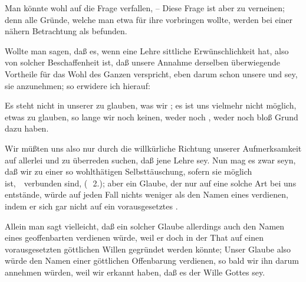 Man könnte wohl auf die Frage verfallen,  -- Diese Frage ist aber zu verneinen; denn alle Gründe, welche man etwa für ihre  vorbringen wollte, werden bei einer nähern Betrachtung als  befunden.
\begin{aufza}
\item Wollte man sagen, daß es, wenn eine Lehre sittliche Erwünschlichkeit hat, also von solcher Beschaffenheit ist, daß unsere Annahme derselben überwiegende Vortheile für das Wohl des Ganzen verspricht, eben darum schon unsere  und  sey, sie anzunehmen; so erwidere ich hierauf:
\begin{aufzb}
\item Es steht nicht in unserer  zu glauben, was wir ; es ist uns vielmehr nicht möglich, etwas zu glauben, so lange wir noch keinen, weder  noch , weder  noch bloß  Grund dazu haben.
\item Wir müßten uns also nur durch die willkürliche Richtung unserer Aufmerksamkeit auf allerlei  und zu überreden suchen, daß jene Lehre  sey. Nun mag es zwar seyn, daß wir zu einer so wohlthätigen Selbsttäuschung, sofern sie möglich ist,~\ verbunden sind, (\ \no\,2.); aber ein Glaube, der nur auf eine solche Art bei uns entstände, würde auf jeden Fall nichts weniger als den Namen eines  verdienen, indem er sich gar nicht auf ein vorausgesetztes .
\end{aufzb}
\item Allein man sagt vielleicht, daß ein solcher Glaube allerdings auch den Namen eines geoffenbarten verdienen würde, weil er doch in der That auf einen vorausgesetzten göttlichen Willen gegründet werden könnte;  Unser Glaube also würde den Namen einer göttlichen Offenbarung verdienen, so bald wir ihn darum annehmen würden, weil wir erkannt haben, daß es der Wille Gottes sey.
\end{aufza}\par
